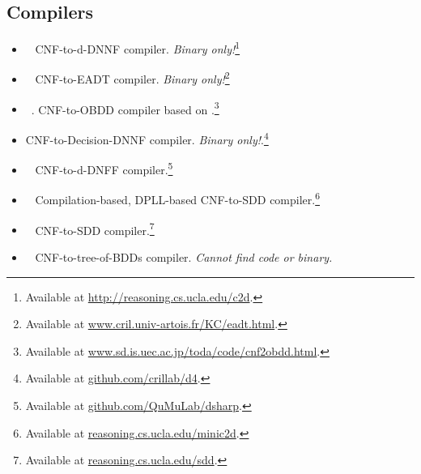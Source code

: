 \documentclass[a4paper]{tufte-handout}
\begin{document}
\begin{counters}
		\subsection*{Compilers}
		\begin{itemize}
			\item \ctod{}~\citep{Dar04} CNF-to-d-DNNF compiler. {\em Binary only!}\footnote{Available at \href{reasoning.cs.ucla.edu/c2d/}{http://reasoning.cs.ucla.edu/c2d}.}
			\item \cnftoeadt{}~\citep{KLM+13} CNF-to-EADT compiler. {\em Binary only!}\footnote{Available at \href{http://www.cril.univ-artois.fr/KC/eadt.html}{www.cril.univ-artois.fr/KC/eadt.html}.}
			\item \cnftoobdd{}~\citep{TT16}. CNF-to-OBDD compiler based on \miniSAT{}.\footnote{Available at \href{http://www.sd.is.uec.ac.jp/toda/code/cnf2obdd.html}{www.sd.is.uec.ac.jp/toda/code/cnf2obdd.html}.}
			\item \dfour{} CNF-to-Decision-DNNF compiler. {\em Binary only!}.\footnote{Available at \href{https://github.com/crillab/d4}{github.com/crillab/d4}.}
			\item \dsharp{}~\citep{MMB+12} CNF-to-d-DNFF compiler.\footnote{Available at \href{https://github.com/QuMuLab/dsharp}{github.com/QuMuLab/dsharp}.}
			\item \minictod{}~\citep{OD15} Compilation-based, DPLL-based CNF-to-SDD compiler.\footnote{Available at \href{http://reasoning.cs.ucla.edu/minic2d/}{reasoning.cs.ucla.edu/minic2d}.}
			\item \sdd{}~\citep{CD13} CNF-to-SDD compiler.\footnote{Available at \href{http://reasoning.cs.ucla.edu/sdd/}{reasoning.cs.ucla.edu/sdd}.}
			\item \treeofbdds{}~\citep{SBH07} CNF-to-tree-of-BDDs compiler. {\em Cannot find code or binary.}
		\end{itemize}
	

\end{counters}
\end{document}

